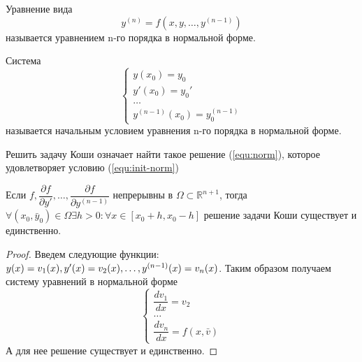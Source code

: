 \begin{definition}
	Уравнение вида
	\begin{equation}
		\label{equ:norm}
		y^{(n)} = f(x, y, \dots, y^{(n-1)})
	\end{equation}
	называется уравнением n-го порядка в нормальной форме.
\end{definition}

\begin{definition}
	Система
	\begin{equation}
		\label{equ:init-norm}
		\begin{cases*}
			y(x_0) = y_0\\
			y'(x_0) = y_0'\\
			\dots \\
			y^{(n-1)}(x_0) = y^{(n-1)}_0
		\end{cases*}
	\end{equation}
	называется начальным условием уравнения n-го порядка в нормальной форме.
\end{definition}

\begin{proposition}
	Решить задачу Коши означает найти такое решение (\ref{equ:norm}), которое удовлетворяет условию (\ref{equ:init-norm})
\end{proposition}

\begin{theorem}
	Если $f, \dfrac{\partial f}{\partial y'}, \dots, \dfrac{\partial f}{\partial y^{(n-1)}}$ непрерывны в $\Omega \subset \mathbb{R}^{n+1}$, тогда $\forall (x_0, \bar{y}_0) \in \Omega \exists h > 0: \forall x\in [x_0 +h, x_0-h]$ решение задачи Коши существует и единственно.
\end{theorem}

\begin{proof}
	Введем следующие функции: $y(x) = v_1(x), y'(x) = v_2(x), \dots, y^{(n-1)}(x) \hm= v_n(x)$. Таким образом получаем систему уравнений в нормальной форме
	\begin{equation}
		\begin{cases*}
			\dfrac{dv_1}{dx} = v_2\\
			\dots\\
			\dfrac{dv_n}{dx} = f(x, \bar{v})
		\end{cases*}
	\end{equation}
	А для нее решение существует и единственно.
\end{proof}
